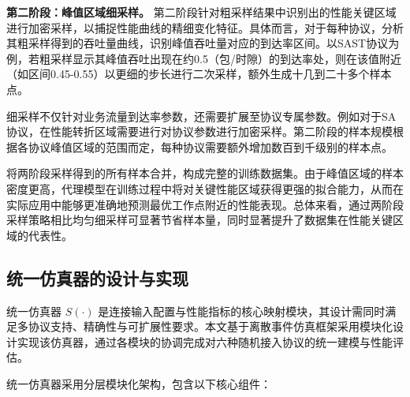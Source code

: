 \textbf{第二阶段：峰值区域细采样。}
第二阶段针对粗采样结果中识别出的性能关键区域进行加密采样，以捕捉性能曲线的精细变化特征。具体而言，对于每种协议，分析其粗采样得到的吞吐量曲线，识别峰值吞吐量对应的到达率区间。以SAST协议为例，若粗采样显示其峰值吞吐出现在约0.5（包/时隙）的到达率处，则在该值附近（如区间0.45-0.55）以更细的步长进行二次采样，额外生成十几到二十多个样本点。

细采样不仅针对业务流量到达率参数，还需要扩展至协议专属参数。例如对于SA协议，在性能转折区域需要进行对协议参数进行加密采样。第二阶段的样本规模根据各协议峰值区域的范围而定，每种协议需要额外增加数百到千级别的样本点。

将两阶段采样得到的所有样本合并，构成完整的训练数据集。由于峰值区域的样本密度更高，代理模型在训练过程中将对关键性能区域获得更强的拟合能力，从而在实际应用中能够更准确地预测最优工作点附近的性能表现。总体来看，通过两阶段采样策略相比均匀细采样可显著节省样本量，同时显著提升了数据集在性能关键区域的代表性。

\subsection{统一仿真器的设计与实现}
\label{subsec:unified_simulator}

统一仿真器 $S(\cdot)$ 是连接输入配置与性能指标的核心映射模块，其设计需同时满足多协议支持、精确性与可扩展性要求。本文基于离散事件仿真框架采用模块化设计实现该仿真器，通过各模块的协调完成对六种随机接入协议的统一建模与性能评估。

统一仿真器采用分层模块化架构，包含以下核心组件：

